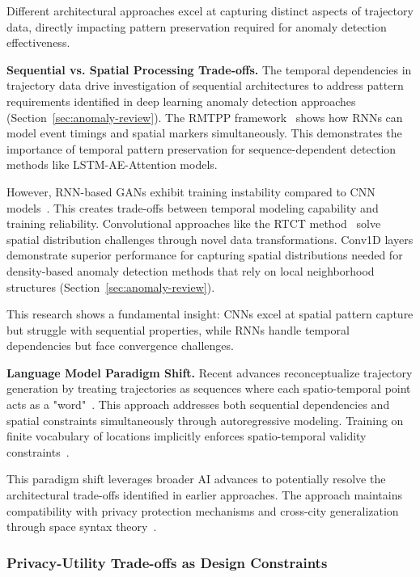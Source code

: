 \documentclass[runningheads]{llncs}
\begin{document}
Different architectural approaches excel at capturing distinct aspects of trajectory data, directly impacting pattern preservation required for anomaly detection effectiveness.

\textbf{Sequential vs. Spatial Processing Trade-offs.} The temporal dependencies in trajectory data drive investigation of sequential architectures to address pattern requirements identified in deep learning anomaly detection approaches (Section~\ref{sec:anomaly-review}). The RMTPP framework~\cite{du2016recurrent} shows how RNNs can model event timings and spatial markers simultaneously. This demonstrates the importance of temporal pattern preservation for sequence-dependent detection methods like LSTM-AE-Attention models.

However, RNN-based GANs exhibit training instability compared to CNN models~\cite{merhi2024synthetic}. This creates trade-offs between temporal modeling capability and training reliability. Convolutional approaches like the RTCT method~\cite{merhi2024synthetic} solve spatial distribution challenges through novel data transformations. Conv1D layers demonstrate superior performance for capturing spatial distributions needed for density-based anomaly detection methods that rely on local neighborhood structures (Section~\ref{sec:anomaly-review}).

This research shows a fundamental insight: CNNs excel at spatial pattern capture but struggle with sequential properties, while RNNs handle temporal dependencies but face convergence challenges.

\textbf{Language Model Paradigm Shift.} Recent advances reconceptualize trajectory generation by treating trajectories as sequences where each spatio-temporal point acts as a "word"~\cite{zhang2025end}. This approach addresses both sequential dependencies and spatial constraints simultaneously through autoregressive modeling. Training on finite vocabulary of locations implicitly enforces spatio-temporal validity constraints~\cite{kong2023mobility}.

This paradigm shift leverages broader AI advances to potentially resolve the architectural trade-offs identified in earlier approaches. The approach maintains compatibility with privacy protection mechanisms and cross-city generalization through space syntax theory~\cite{wang2025gtg}.

\subsubsection{Privacy-Utility Trade-offs as Design Constraints}
\end{document}
